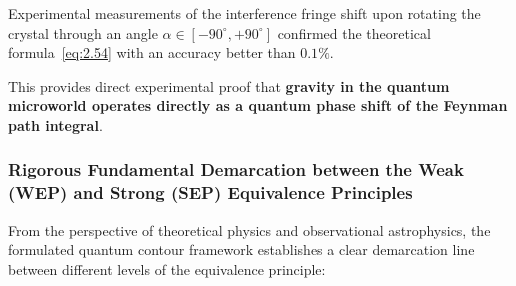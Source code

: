 \documentclass[11pt,a4paper]{article}
\theoremstyle{definition}
\begin{document}
Experimental measurements of the interference fringe shift upon rotating the crystal through an angle $\alpha \in [-90^\circ, +90^\circ]$ confirmed the theoretical formula~\eqref{eq:2.54} with an accuracy better than $0.1\%$.

This provides direct experimental proof that \textbf{gravity in the quantum microworld operates directly as a quantum phase shift of the Feynman path integral}.

\subsubsection{Rigorous Fundamental Demarcation between the Weak (WEP) and Strong (SEP) Equivalence Principles}\label{sec:2.5.4}

From the perspective of theoretical physics and observational astrophysics, the formulated quantum contour framework establishes a clear demarcation line between different levels of the equivalence principle:
\end{document}
